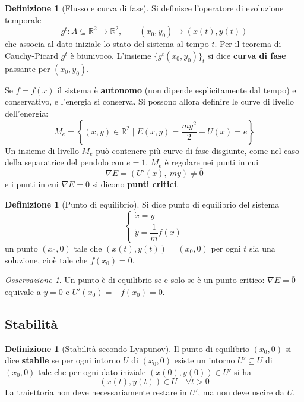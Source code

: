 \documentclass[11pt, a4paper, openright]{book}
\theoremstyle{plain}
\theoremstyle{definition}
\newtheorem{definizione}[teorema]{Definizione}
\theoremstyle{remark}
\newtheorem{osservazione}[teorema]{Osservazione}
\begin{document}
\begin{definizione}[Flusso e curva di fase]
    Si definisce l'operatore di evoluzione temporale
    \begin{equation}
        g^t : A \subseteq \mathbb{R}^2 \longrightarrow \mathbb{R}^2, \qquad (x_0, y_0) \longmapsto (x(t), y(t))
    \end{equation}
    che associa al dato iniziale lo stato del sistema al tempo $t$. Per il teorema di Cauchy-Picard $g^t$ è biunivoco. L'insieme $\{g^t(x_0, y_0)\}_t$ si dice \textbf{curva di fase} passante per $(x_0, y_0)$.
\end{definizione}

Se $f = f(x)$ il sistema è \textbf{autonomo} (non dipende esplicitamente dal tempo) e conservativo, e l'energia si conserva. Si possono allora definire le curve di livello dell'energia:
\begin{equation}
    M_e = \left\{(x, y) \in \mathbb{R}^2 \mid E(x, y) = \frac{m y^2}{2} + U(x) = e\right\}
\end{equation}
Un insieme di livello $M_e$ può contenere più curve di fase disgiunte, come nel caso della separatrice del pendolo con $e = 1$. $M_e$ è regolare nei punti in cui
\begin{equation}
    \nabla E = \left(U'(x),\ m y\right) \neq \bar{0}
\end{equation}
e i punti in cui $\nabla E = \bar{0}$ si dicono \textbf{punti critici}.

\begin{definizione}[Punto di equilibrio]
    Si dice punto di equilibrio del sistema
    \begin{equation}
        \begin{cases}
            \dot{x} = y \\
            \dot{y} = \dfrac{1}{m}f(x)
        \end{cases}
    \end{equation}
    un punto $(x_0, 0)$ tale che $(x(t), y(t)) = (x_0, 0)$ per ogni $t$ sia una soluzione, cioè tale che $f(x_0) = 0$.
\end{definizione}

\begin{osservazione}
    Un punto è di equilibrio se e solo se è un punto critico: $\nabla E = \bar{0}$ equivale a $y = 0$ e $U'(x_0) = -f(x_0) = 0$.
\end{osservazione}

\subsection{Stabilità}
\begin{definizione}[Stabilità secondo Lyapunov]
    Il punto di equilibrio $(x_0, 0)$ si dice \textbf{stabile} se per ogni intorno $U$ di $(x_0, 0)$ esiste un intorno $U' \subseteq U$ di $(x_0, 0)$ tale che per ogni dato iniziale $(x(0), y(0)) \in U'$ si ha
    \begin{equation}
        (x(t), y(t)) \in U \quad \forall t > 0
    \end{equation}
    La traiettoria non deve necessariamente restare in $U'$, ma non deve uscire da $U$.
\end{definizione}
\end{document}
